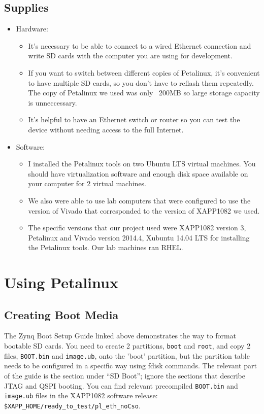 \documentclass[12pt]{report}
\begin{document}
\subsection{Supplies}
\begin{itemize}
  \item Hardware: 
    \begin{itemize}
    \item It's necessary to be able to connect to a wired Ethernet connection and write SD cards with the computer you are using for development.
    \item If you want to switch between different copies of Petalinux, it's convenient to have multiple SD cards, so you don't have to reflash them repeatedly. The copy of Petalinux we used was only ~200MB so large storage capacity is unneccessary.
    \item It's helpful to have an Ethernet switch or router so you can test the device without needing access to the full Internet.
    \end{itemize}
  \item Software:
    \begin{itemize}
    \item I installed the Petalinux tools on two Ubuntu LTS virtual machines. You should have virtualization software and enough disk space available on your computer for 2 virtual machines.
    \item We also were able to use lab computers that were configured to use the version of Vivado that corresponded to the version of XAPP1082 we used.
    \item The specific versions that our project used were XAPP1082 version 3, Petalinux and Vivado version 2014.4, Xubuntu 14.04 LTS for installing the Petalinux tools. Our lab machines ran RHEL.
    \end{itemize}
\end{itemize}
\section{Using Petalinux}
\subsection{Creating Boot Media}
The Zynq Boot Setup Guide linked above demonstrates the way to format bootable SD cards. You need to create 2 partitions, \texttt{boot} and \texttt{root}, and copy 2 files, \texttt{BOOT.bin} and \texttt{image.ub}, onto the 'boot' partition, but the partition table needs to be configured in a specific way using fdisk commands. The relevant part of the guide is the section under ``SD Boot''; ignore the sections that describe JTAG and QSPI booting. You can find relevant precompiled \texttt{BOOT.bin} and \texttt{image.ub} files in the XAPP1082 software release: \texttt{\$XAPP\_HOME/ready\_to\_test/pl\_eth\_noCso}.
\end{document}
